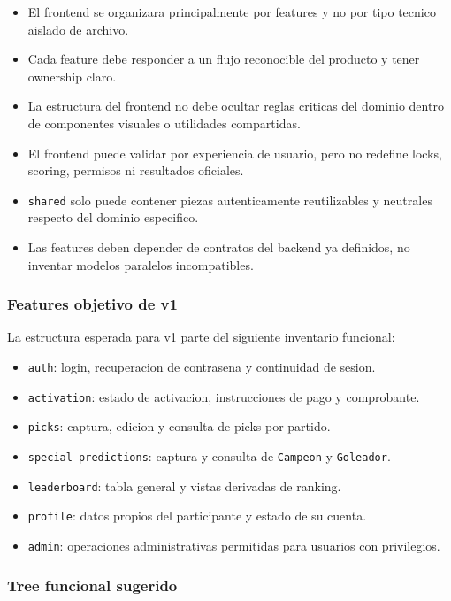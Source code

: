 \begin{itemize}
  \item El frontend se organizara principalmente por features y no por tipo tecnico aislado de archivo.
  \item Cada feature debe responder a un flujo reconocible del producto y tener ownership claro.
  \item La estructura del frontend no debe ocultar reglas criticas del dominio dentro de componentes visuales o utilidades compartidas.
  \item El frontend puede validar por experiencia de usuario, pero no redefine locks, scoring, permisos ni resultados oficiales.
  \item \texttt{shared} solo puede contener piezas autenticamente reutilizables y neutrales respecto del dominio especifico.
  \item Las features deben depender de contratos del backend ya definidos, no inventar modelos paralelos incompatibles.
\end{itemize}

\subsubsection{Features objetivo de v1}

La estructura esperada para v1 parte del siguiente inventario funcional:

\begin{itemize}
  \item \texttt{auth}: login, recuperacion de contrasena y continuidad de sesion.
  \item \texttt{activation}: estado de activacion, instrucciones de pago y comprobante.
  \item \texttt{picks}: captura, edicion y consulta de picks por partido.
  \item \texttt{special-predictions}: captura y consulta de \texttt{Campeon} y \texttt{Goleador}.
  \item \texttt{leaderboard}: tabla general y vistas derivadas de ranking.
  \item \texttt{profile}: datos propios del participante y estado de su cuenta.
  \item \texttt{admin}: operaciones administrativas permitidas para usuarios con privilegios.
\end{itemize}

\subsubsection{Tree funcional sugerido}

